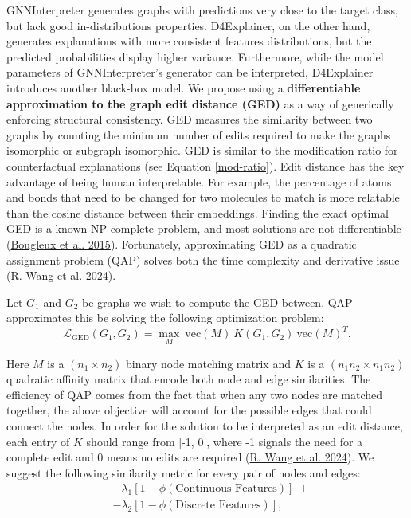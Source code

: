 \documentclass[
  11pt,
  letterpaper,
]{article}
\begin{document}
\quad GNNInterpreter generates graphs with predictions very close to the
target class, but lack good in-distributions properties. D4Explainer, on
the other hand, generates explanations with more consistent features
distributions, but the predicted probabilities display higher variance.
Furthermore, while the model parameters of GNNInterpreter's generator
can be interpreted, D4Explainer introduces another black-box model. We
propose using a \textbf{differentiable approximation to the graph edit
distance (GED)} as a way of generically enforcing structural
consistency. GED measures the similarity between two graphs by counting
the minimum number of edits required to make the graphs isomorphic or
subgraph isomorphic. GED is similar to the modification ratio for
counterfactual explanations (see Equation \ref{mod-ratio}). Edit
distance has the key advantage of being human interpretable. For
example, the percentage of atoms and bonds that need to be changed for
two molecules to match is more relatable than the cosine distance
between their embeddings. Finding the exact optimal GED is a known
NP-complete problem, and most solutions are not differentiable
(\protect\hyperlink{ref-Bougleux_Brun_Carletti_Foggia_Gauxfczuxe8re_Vento_2015}{Bougleux
et al. 2015}). Fortunately, approximating GED as a quadratic assignment
problem (QAP) solves both the time complexity and derivative issue
(\protect\hyperlink{ref-wang2024pygm}{R. Wang et al. 2024}).

\quad Let \(G_1\) and \(G_2\) be graphs we wish to compute the GED
between. QAP approximates this be solving the following optimization
problem: \begin{equation} \label{QAP-obj}
    \mathcal{L}_{\text{GED}}(G_1, G_2) = \underset{M}{\max} \ \text{vec}(M) \ K(G_1, G_2) \ \text{vec}(M)^T.
\end{equation}

Here \(M\) is a \((n_1 \times n_2)\) binary node matching matrix and
\(K\) is a \((n_1 n_2 \times n_1 n_2)\) quadratic affinity matrix that
encode both node and edge similarities. The efficiency of QAP comes from
the fact that when any two nodes are matched together, the above
objective will account for the possible edges that could connect the
nodes. In order for the solution to be interpreted as an edit distance,
each entry of \(K\) should range from {[}-1, 0{]}, where -1 signals the
need for a complete edit and 0 means no edits are required
(\protect\hyperlink{ref-wang2024pygm}{R. Wang et al. 2024}). We suggest
the following similarity metric for every pair of nodes and edges:
\begin{equation}
    \begin{split}
         &-\lambda_1 \left[ 1 - \phi(\text{Continuous Features}) \right] \ + \\
         &-\lambda_2 \left[1 - \phi(\text{Discrete Features}) \right], 
    \end{split}
\end{equation}
\end{document}
